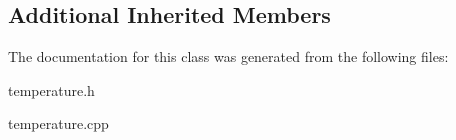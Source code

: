 \subsection*{Additional Inherited Members}


The documentation for this class was generated from the following files\+:\begin{DoxyCompactItemize}
\item 
temperature.\+h\item 
temperature.\+cpp\end{DoxyCompactItemize}
